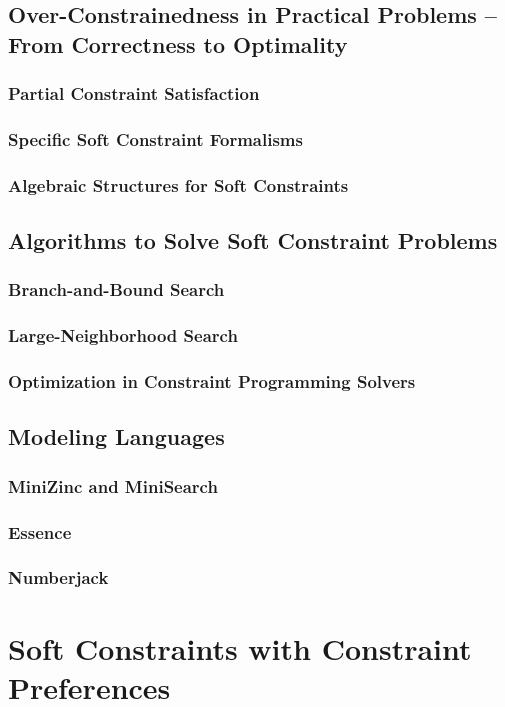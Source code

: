 \documentclass[10pt,a4paper]{book}
\begin{document}
\section{Over-Constrainedness in Practical Problems -- From Correctness to Optimality}
\subsection{Partial Constraint Satisfaction}
\subsection{Specific Soft Constraint Formalisms}
\subsection{Algebraic Structures for Soft Constraints}

\section{Algorithms to Solve Soft Constraint Problems }
\subsection{Branch-and-Bound Search}
\subsection{Large-Neighborhood Search}
\subsection{Optimization in Constraint Programming Solvers}

\section{Modeling Languages}
\subsection{MiniZinc and MiniSearch}
\subsection{Essence}
\subsection{Numberjack}

\chapter{Soft Constraints with Constraint Preferences}
\end{document}
